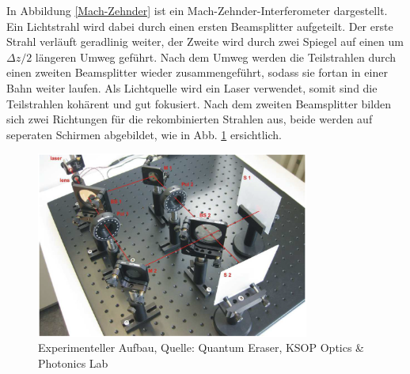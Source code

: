 \documentclass{include/thesisclass3}
\begin{document}
In Abbildung \ref{Mach-Zehnder} ist ein Mach-Zehnder-Interferometer dargestellt. Ein Lichtstrahl wird dabei durch einen ersten Beamsplitter aufgeteilt. Der erste Strahl verläuft geradlinig weiter, der Zweite wird durch zwei Spiegel auf einen um $\Delta z/2$ längeren Umweg geführt. Nach dem Umweg werden die Teilstrahlen durch einen zweiten Beamsplitter wieder zusammengeführt, sodass sie fortan in einer Bahn weiter laufen. Als Lichtquelle wird ein Laser verwendet, somit sind die Teilstrahlen kohärent und gut fokusiert. Nach dem zweiten Beamsplitter bilden sich zwei Richtungen für die rekombinierten Strahlen aus, beide werden auf seperaten Schirmen abgebildet, wie in Abb. \ref{Aufbau} ersichtlich. 
\begin{figure}[H]
	\begin{center}
		\includegraphics[width=0.8\textwidth]{images/Aufbau.png}
		\caption{Experimenteller Aufbau, Quelle: Quantum Eraser, KSOP Optics \& Photonics Lab}
		\label{Aufbau}
	\end{center}
\end{figure}
\end{document}
